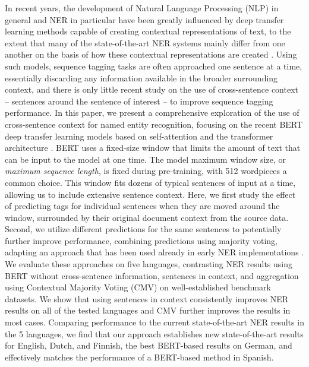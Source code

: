 In recent years, the development of Natural Language Processing (NLP) in general and NER in particular have been greatly influenced by deep transfer learning methods capable of creating contextual representations of text, to the extent that many of the state-of-the-art NER systems mainly differ from one another on the basis of how these contextual representations are created \cite{Peters_2018,devlin2018bert,akbik2018coling,Baevski_2019}. Using such models, sequence tagging tasks are often approached one sentence at a time, essentially discarding any information available in the broader surrounding context, and there is only little recent study on the use of cross-sentence context -- sentences around the sentence of interest -- to improve sequence tagging performance. In this paper, we present a comprehensive exploration of the use of cross-sentence context for named entity recognition, focusing on the recent BERT deep transfer learning models \cite{devlin2018bert} based on self-attention and the transformer architecture \cite{vaswani2017attention}. BERT uses a fixed-size window that limits the amount of text that can be input to the model at one time. The model maximum window size, or \emph{maximum sequence length}, is fixed during pre-training, with 512 wordpieces a common choice. This window fits dozens of typical sentences of input at a time, allowing us to include extensive sentence context. Here, we first study the effect of predicting tags for individual sentences when they are moved around the window, surrounded by their original document context from the source data. Second, we utilize different predictions for the same sentences to potentially further improve performance, combining predictions using majority voting, adapting an approach that has been used already in early NER implementations \cite{tjong-kim-sang-etal-2000-applying,van-halteren-etal-2001-improving,florian-etal-2003-named}.
We evaluate these approaches on five languages, contrasting NER results using BERT without cross-sentence information, sentences in context, and aggregation using Contextual Majority Voting (CMV) on well-established benchmark datasets.
We show that using sentences in context consistently improves NER results on all of the tested languages and CMV further improves the results in most cases. Comparing performance to the current state-of-the-art NER results in the 5 languages, we find that our approach establishes new state-of-the-art results for English, Dutch, and Finnish, the best BERT-based results on German, and effectively matches the performance of a BERT-based method in Spanish. 

